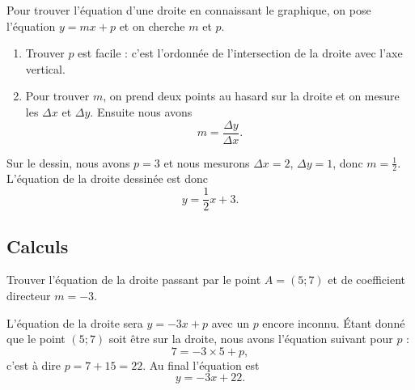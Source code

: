 \begin{minipage}{0.485\textwidth}
Pour trouver l'équation d'une droite en connaissant le graphique, on pose l'équation \( y=mx+p\) et on cherche \( m\) et \( p\).
\begin{enumerate}
    \item
        Trouver \( p\) est facile : c'est l'ordonnée de l'intersection de la droite avec l'axe vertical.
    \item
        Pour trouver \( m\), on prend deux points au hasard sur la droite et on mesure les \( \Delta x\) et \( \Delta y\). Ensuite nous avons
        \begin{equation}
            m=\frac{ \Delta y }{ \Delta x }.
        \end{equation}
\end{enumerate}
\end{minipage}
\hspace{1mm}
\begin{minipage}{0.485\textwidth}
\begin{center}

\end{center}
\end{minipage}


Sur le dessin, nous avons \( p=3\) et nous mesurons \( \Delta x=2\), \( \Delta y=1\), donc \( m=\frac{ 1 }{2}\). L'équation de la droite dessinée est donc
\begin{equation}
    y=\frac{ 1 }{2}x+3.
\end{equation}

\subsection{Calculs}

\begin{example}
    Trouver l'équation de la droite passant par le point \( A=(5;7)\) et de coefficient directeur \( m=-3\). 

    L'équation de la droite sera \( y=-3x+p\) avec un \( p\) encore inconnu. Étant donné que le point \( (5;7)\) soit être sur la droite, nous avons l'équation suivant pour \( p\) :
    \begin{equation}
        7=-3\times 5+p,
    \end{equation}
    c'est à dire \( p=7+15=22\). Au final l'équation est
    \begin{equation}
        y=-3x+22.
    \end{equation}
\end{example}


